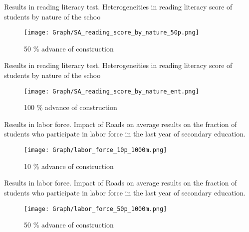 \documentclass[9pt]{beamer}
\begin{document}
\begin{frame}{ Results in reading literacy test.  \hyperlink{result_read_}{} }\label{50p_read_nat}
\small Heterogeneities in reading literacy score of students by nature of the schoo
\begin{figure}
  \centering
  \texttt{[image: Graph/SA\_reading\_score\_by\_nature\_50p.png]} 
  \caption{\small 50 \% advance of construction}
  \label{fig:6.1sub-first}
\end{figure}

\end{frame}

\begin{frame}{ Results in reading literacy test.  \hyperlink{result_read_}{} }\label{100p_read_nat}
\small Heterogeneities in reading literacy score of students by nature of the schoo
\begin{figure}
  \centering
  \texttt{[image: Graph/SA\_reading\_score\_by\_nature\_ent.png]} 
  \caption{\small 100 \% advance of construction}
  \label{fig:6.1sub-first}
\end{figure}

\end{frame}



\begin{frame}{ Results in labor force. \hyperlink{result_labor}{}  } \label{10p_labor}
Impact of Roads on average results on the fraction of students who participate in labor force in the last year of secondary education. 
\begin{figure}
  \centering
  \texttt{[image: Graph/labor\_force\_10p\_1000m.png]} 
  \caption{\small 10 \% advance of construction}
  \label{fig:6.1sub-first}
\end{figure}

\end{frame}
 
\begin{frame}{ Results in labor force.\hyperlink{result_labor}{} }  \label{50p_labor}
Impact of Roads on average results on the fraction of students who participate in labor force in the last year of secondary education. 
\begin{figure}
  \centering
  \texttt{[image: Graph/labor\_force\_50p\_1000m.png]} 
  \caption{\small 50 \% advance of construction}
  \label{fig:6.1sub-first}
\end{figure}

\end{frame}
\end{document}
